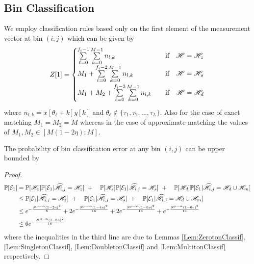 \subsection{\bf Bin Classification}
We employ classification rules based only on the first element of the measurement vector at bin $(i,j)$ which can be given by
\begin{align}
Z[1]=\begin{cases}
\sum\limits_{\ell=0}^{f_{i}-1}\sum\limits_{k=0}^{M-1} n_{l,k}  & ~~\text{ if } ~~ \msc{H}=\msc{H}_z\label{Eqn:BinCombination}\\
\vspace{\vgap}
M_1+\sum\limits_{\ell=0}^{f_{i}-2}\sum\limits_{k=0}^{M-1} n_{l,k}  & ~~\text{ if } ~~ \msc{H}=\msc{H}_s\\
\vspace{\vgap}
M_1+M_2+\sum\limits_{\ell=0}^{f_{i}-3}\sum\limits_{k=0}^{M-1} n_{l,k}  & ~~\text{ if } ~~ \msc{H}=\msc{H}_d\\
\end{cases}
\end{align}
where $n_{l,k}=x[\theta_{\ell}+k]y[k]$ and $\theta_{\ell}\notin\{\tau_1,\tau_2,\ldots,\tau_L\}$. Also for the case of exact matching $M_1=M_2=M$ whereas in the case of approximate matching the values of $M_1,M_2\in[M(1-2\eta):M]$.

\begin{lemma}
The probability of bin classification error at any bin $(i,j)$ can be upper bounded by
\end{lemma}

\begin{proof}
\begin{align*}
\mathbb{P}[\mathcal{E}_1]&=\mathbb{P}[\mathscr{H}_z]\mathbb{P}[\mathcal{E}_1|\widehat{\mathscr{H}}_{i,j}=\mathscr{H}_z]~+
						\quad \mathbb{P}[\mathscr{H}_s]\mathbb{P}[\mathcal{E}_1|\widehat{\mathscr{H}}_{i,j}=\mathscr{H}_s]~+
						\quad\mathbb{P}[\mathscr{H}_d]\mathbb{P}[\mathcal{E}_1|\widehat{\mathscr{H}}_{i,j}=\mathscr{H}_d \cup \mathscr{H}_m]\\
				&\leq \mathbb{P}[\mathcal{E}_1|\widehat{\mathscr{H}}_{i,j}=\mathscr{H}_z]~+
						\quad \mathbb{P}[\mathcal{E}_1|\widehat{\mathscr{H}}_{i,j}=\mathscr{H}_s]~+
						\quad \mathbb{P}[\mathcal{E}_1|\widehat{\mathscr{H}}_{i,j}=\mathscr{H}_d \cup \mathscr{H}_m]\\
    			&\leq  e^{-\frac{N^{\mu-\alpha}(1-2\eta)^2}{8}}+2e^{-\frac{N^{\mu-\alpha}(1-4\eta)^2}{16}}+ 2e^{-\frac{N^{\mu-\alpha}(1-6\eta)^2}{16}}+e^{-\frac{N^{\mu-\alpha}(1-6\eta)^2}{16}}\\
    			&\leq 6e^{-\frac{N^{\mu-\alpha}(1-6\eta)^2}{16}}\\
						\end{align*}
						where the inequalities in the third line are due to Lemmas \ref{Lem:ZerotonClassif}, \ref{Lem:SingletonClassif}, \ref{Lem:DoubletonClassif} and \ref{Lem:MultitonClassif} respectively.
\end{proof}

